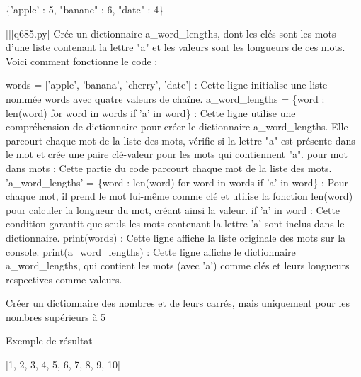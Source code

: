 \{'apple' : 5, "banane" : 6, "date" : 4\}
        \par
        \begin{solution}
            \renewcommand{\nomfichier}{q685.py}
            \pythonfile{\chemincode \nomfichier}[][\nomfichier]
            Crée un dictionnaire a\_word\_lengths, dont les clés sont les mots d'une liste contenant la lettre "a" et les valeurs sont les longueurs de ces mots. Voici comment fonctionne le code :

    words = ['apple', 'banana', 'cherry', 'date'] : Cette ligne initialise une liste nommée words avec quatre valeurs de chaîne.
    a\_word\_lengths = \{word : len(word) for word in words if 'a' in word\} : Cette ligne utilise une compréhension de dictionnaire pour créer le dictionnaire a\_word\_lengths. Elle parcourt chaque mot de la liste des mots, vérifie si la lettre "a" est présente dans le mot et crée une paire clé-valeur pour les mots qui contiennent "a".
        pour mot dans mots : Cette partie du code parcourt chaque mot de la liste des mots.
        'a\_word\_lengths' = \{word : len(word) for word in words if 'a' in word\} : Pour chaque mot, il prend le mot lui-même comme clé et utilise la fonction len(word) pour calculer la longueur du mot, créant ainsi la valeur.
        if 'a' in word : Cette condition garantit que seuls les mots contenant la lettre 'a' sont inclus dans le dictionnaire.
    print(words) : Cette ligne affiche la liste originale des mots sur la console.
    print(a\_word\_lengths) : Cette ligne affiche le dictionnaire a\_word\_lengths, qui contient les mots (avec 'a') comme clés et leurs longueurs respectives comme valeurs.
        \end{solution}
        

        \question
        Créer un dictionnaire des nombres et de leurs carrés, mais uniquement pour les nombres supérieurs à 5

Exemple de résultat

[1, 2, 3, 4, 5, 6, 7, 8, 9, 10]

